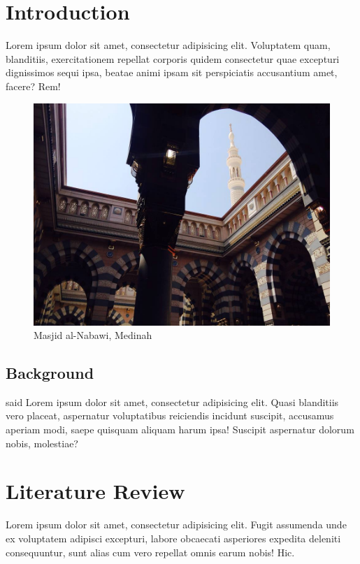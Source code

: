 \chapter{Introduction}\label{introduction}

Lorem ipsum \autocite{partridge2011forty} dolor sit amet, consectetur
adipisicing elit. Voluptatem quam, blanditiis, exercitationem repellat
corporis quidem consectetur quae excepturi dignissimos sequi ipsa,
beatae animi ipsam sit perspiciatis accusantium amet, facere? Rem!

\begin{figure}
\centering
\includegraphics[width=1.00000\textwidth]{figures/madinah.jpg}
\caption{Masjid al-Nabawi, Medinah}
\end{figure}

\section{Background}\label{background}

\textcite{7282364} said Lorem ipsum dolor sit amet, consectetur
adipisicing elit. Quasi blanditiis vero placeat, aspernatur voluptatibus
reiciendis incidunt suscipit, accusamus aperiam modi, saepe quisquam
aliquam harum ipsa! Suscipit aspernatur dolorum nobis, molestiae?

\chapter{Literature Review}\label{literature-review}

Lorem ipsum dolor sit amet, consectetur adipisicing elit. Fugit
assumenda unde ex voluptatem adipisci excepturi, labore obcaecati
asperiores expedita deleniti consequuntur, sunt alias cum vero repellat
omnis earum nobis! Hic.

